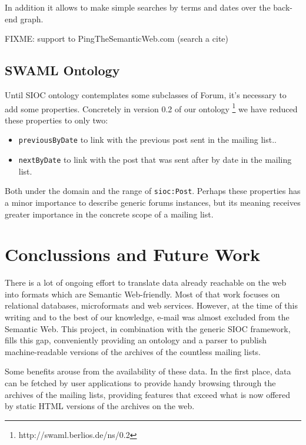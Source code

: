 \documentclass{llncs}
\begin{document}
In addition it allows to make simple searches by terms and dates over the back-end graph.

FIXME: support to PingTheSemanticWeb.com (search a cite)

\subsection{SWAML Ontology}

Until SIOC ontology contemplates some subclasses of Forum, it's necessary 
to add some properties. Concretely in version 0.2 of our ontology 
\footnote{http://swaml.berlios.de/ns/0.2} we have reduced these properties 
to only two:

\begin{itemize}
  \item \texttt{previousByDate} to link with the previous post sent in the 
	mailing list..
  \item \texttt{nextByDate} to link with the post that was sent after by date 
	in the mailing list.
\end{itemize}

Both under the domain and the range of \texttt{sioc:Post}. Perhaps these 
properties has a minor importance to describe generic forums instances, 
but its meaning receives greater importance in the concrete scope of a 
mailing list.

\section{\label{sec:conclussions}Conclussions and Future Work}

There is a lot of ongoing effort to translate data already reachable
on the web into formats
which are Semantic Web-friendly. Most of that work focuses on relational
databases, microformats and web services. However, at the time of this
writing and to the best of our knowledge, e-mail was almost excluded from the
Semantic Web. This project, in combination with the generic SIOC framework,
fills this gap, conveniently providing
an ontology and a parser to publish machine-readable versions of the
archives of the countless mailing lists.

Some benefits arouse from the availability of these data. In the first
place, data can be fetched by user applications to provide handy browsing
through the archives of the mailing lists, providing features that
exceed what is now offered by static HTML versions of the archives on
the web.
\end{document}
